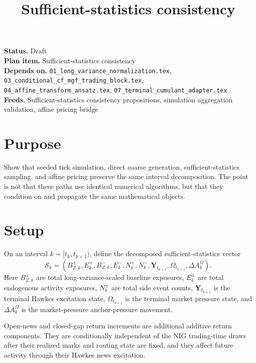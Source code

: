 \documentclass[11pt]{article}
\title{Sufficient-statistics consistency}
\author{}
\date{}
\begin{document}
\maketitle

\noindent\textbf{Status.} Draft\\
\textbf{Plan item.} Sufficient-statistics consistency\\
\textbf{Depends on.} \texttt{01\_long\_variance\_normalization.tex},
\texttt{03\_conditional\_cf\_mgf\_trading\_block.tex},
\texttt{04\_affine\_transform\_ansatz.tex},
\texttt{07\_terminal\_cumulant\_adapter.tex}\\
\textbf{Feeds.} Sufficient-statistics consistency propositions, simulation aggregation validation, affine pricing bridge

\section{Purpose}

Show that seeded tick simulation, direct coarse generation,
sufficient-statistics sampling, and affine pricing preserve the same
interval decomposition.
The point is not that these paths use identical numerical algorithms, but that
they condition on and propagate the same mathematical objects.

\section{Setup}

On an interval \(k=[t_k,t_{k+1})\), define the decomposed sufficient-statistics
vector
\[
    \mathcal S_k
    =
    \left(
        B_{Z,k}^+,
        E_k^+,
        B_{Z,k}^-,
        E_k^-,
        N_k^+,
        N_k^-,
        \mathbf Y_{t_{k+1}},
        \Omega_{t_{k+1}},
        \Delta A_k^\Omega
    \right).
\]
Here \(B_{Z,k}^\pm\) are total long-variance-scaled baseline exposures,
\(E_k^\pm\) are total endogenous activity exposures, \(N_k^\pm\) are total
side event counts, \(\mathbf Y_{t_{k+1}}\) is the terminal Hawkes excitation
state, \(\Omega_{t_{k+1}}\) is the terminal market pressure state, and
\(\Delta A_k^\Omega\) is the market-pressure anchor-pressure movement.

Open-news and closed-gap return increments are additional additive return
components.
They are conditionally independent of the NIG trading-time draws after their
realized marks and routing state are fixed, and they affect future activity
through their Hawkes news excitation.
\end{document}
